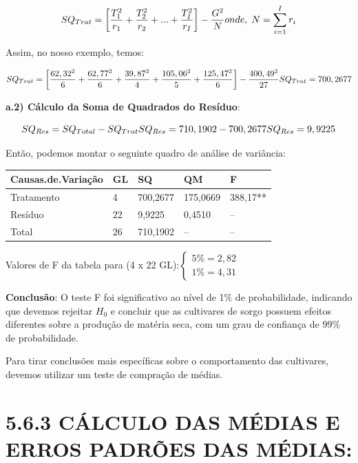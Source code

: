 \documentclass[
]{book}
\begin{document}
\[
SQ_{Trat} =\left[ {\frac{T_1^2}{r_1}+\frac{T_2^2}{r_2}+...+\frac{T_I^2}{r_I}} \right] - \frac{G^2}{N}\\
onde,\; N=\sum_{i=1}^Ir_i\\
\]

Assim, no nosso exemplo, temos:

\[
SQ_{Trat} =\left[ {\frac{62,32^2}{6}+\frac{62,77^2}{6}+\frac{39,87^2}{4}+\frac{105,06^2}{5}+\frac{125,47^2}{6}} \right] - \frac{400,49^2}{27}\\ 
SQ_{Trat}= 700,2677
\]

\textbf{a.2) Cálculo da Soma de Quadrados do Resíduo}:

\[
SQ_{Res} = SQ_{Total} - SQ_{Trat} \\
SQ_{Res} = 710,1902 - 700,2677 \\
SQ_{Res} = 9,9225
\]

Então, podemos montar o seguinte quadro de análise de variância:

\begin{table}[H]
\centering
\begin{tabular}{l|l|l|l|l}
\hline
Causas.de.Variação & GL & SQ & QM & F\\
\hline
Tratamento & 4 & 700,2677 & 175,0669 & 388,17**\\
\hline
Resíduo & 22 & 9,9225 & 0,4510 & --\\
\hline
Total & 26 & 710,1902 & -- & --\\
\hline
\end{tabular}
\end{table}

Valores de F da tabela para (4 x 22 GL):\(\begin{cases} 5\%=2,82 \\ 1\%=4,31 \end{cases}\)

\textbf{Conclusão}: O teste F foi significativo ao nível de 1\% de probabilidade, indicando que devemos rejeitar \(H_0\) e concluir que as cultivares de sorgo possuem efeitos diferentes sobre a produção de matéria seca, com um grau de confiança de \(99\%\) de probabilidade.

Para tirar conclusões mais específicas sobre o comportamento das cultivares, devemos utilizar um teste de compração de médias.

\hypertarget{cuxe1lculo-das-muxe9dias-e-erros-padruxf5es-das-muxe9dias}{%
\section{5.6.3 CÁLCULO DAS MÉDIAS E ERROS PADRÕES DAS MÉDIAS:}\label{cuxe1lculo-das-muxe9dias-e-erros-padruxf5es-das-muxe9dias}}
\end{document}
